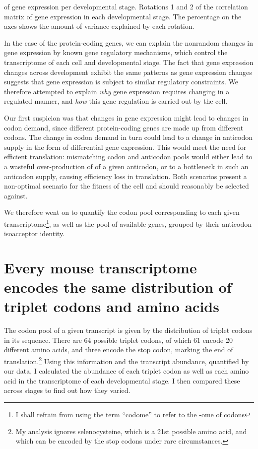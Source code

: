     {\pca of \trna gene expression per developmental stage.}
    {Rotations \num{1} and \num{2} of the correlation matrix of
    \trna gene expression in each developmental stage. The percentage on the
    axes shows the amount of variance explained by each rotation.}

In the case of the protein-coding genes, we can explain the nonrandom changes in
gene expression by known gene regulatory mechanisms, which control the
transcriptome of each cell and developmental stage. The fact that \trna gene
expression changes across development exhibit the same patterns as \mrna gene
expression changes suggests that \trna gene expression is subject to similar
regulatory constraints. We therefore attempted to explain \emph{why} \trna gene
expression requires changing in a regulated manner, and \emph{how} this \trna
gene regulation is carried out by the cell.

Our first suspicion was that changes in \mrna gene expression might lead to
changes in codon demand, since different protein-coding genes are made up from
different codons. The change in codon demand in turn could lead to a change in
anticodon supply in the form of differential \trna gene expression. This would
meet the need for efficient translation: mismatching codon and anticodon pools
would either lead to a wasteful over-production of \trna[s] of a given
anticodon, or to a bottleneck in such an anticodon supply, causing efficiency
loss in translation. Both scenarios present a non-optimal scenario for the
fitness of the cell and should reasonably be selected against.

We therefore went on to quantify the codon pool corresponding to each given
transcriptome\footnote{I shall refrain from using the term “codome” to refer to
the -ome of codons}, as well as the pool of available \trna genes, grouped by
their anticodon isoacceptor identity.

\section{Every mouse \mrna transcriptome encodes the same distribution of
triplet codons and amino acids}

The codon pool of a given \mrna transcript is given by the distribution of
triplet codons in its sequence. There are 64 possible triplet codons, of which
61 encode 20 different amino acids, and three encode the stop codon, marking the
end of translation.\footnote{My analysis ignores selenocysteine, which is a
\num{21}st possible amino acid, and which can be encoded by the stop codons
 under rare circumstances.} Using this information and the transcript
abundance, quantified by our \rnaseq data, I calculated the abundance of each
triplet codon as well as each amino acid in the transcriptome of each
developmental stage. I then compared these across stages to find out how they
varied.

